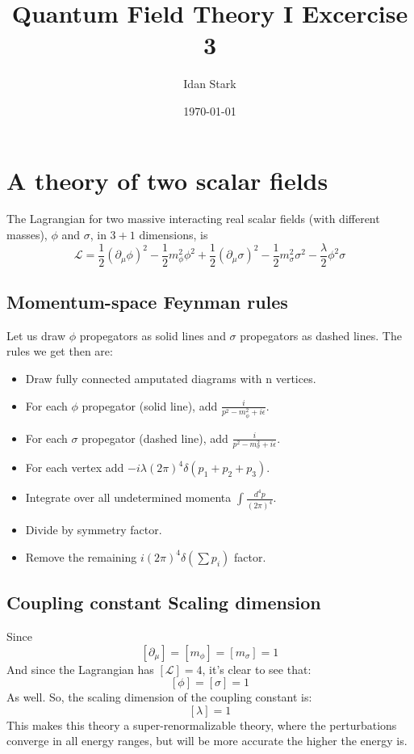 \documentclass{article}
\title{Quantum Field Theory I Excercise 3}
\author{Idan Stark}
\date{\today}
\begin{document}
\maketitle

\section{A theory of two scalar fields}
The Lagrangian for two massive interacting real scalar fields (with different masses), $\phi$ and $\sigma$, in $3 + 1$ dimensions, is
\begin{equation}
    \mathcal{L} = \frac{1}{2}(\partial_\mu \phi)^2 - \frac{1}{2}m_\phi^2 \phi^2 + \frac{1}{2}(\partial_\mu \sigma)^2 - \frac{1}{2}m_\sigma^2 \sigma^2 - \frac{\lambda}{2} \phi^2 \sigma
\end{equation}
\subsection{Momentum-space Feynman rules}
Let us draw $\phi$ propegators as solid lines and $\sigma$ propegators as  dashed lines. The rules we get then are:
\begin{itemize}
    \item Draw fully connected amputated diagrams with n vertices.
    \item For each $\phi$ propegator (solid line), add $\frac{i}{p^2 - m_\phi^2 + i\epsilon}$.
    \item For each $\sigma$ propegator (dashed line), add $\frac{i}{p^2 - m_\sigma^2 + i\epsilon}$.
    \item For each vertex add $-i\lambda (2\pi)^4 \delta(p_1 + p_2 + p_3)$.
    \item Integrate over all undetermined momenta $\int \frac{d^4p}{(2\pi)^4}$.
    \item Divide by symmetry factor.
    \item Remove the remaining $i(2\pi)^4\delta(\sum p_i)$ factor.
\end{itemize}
\subsection{Coupling constant Scaling dimension}
Since
\begin{equation}
    \left[\partial_\mu\right] = \left[m_\phi\right] = \left[m_\sigma\right] = 1
\end{equation}
And since the Lagrangian has $\left[\mathcal{L}\right] = 4$, it's clear to see that:
\begin{equation}
    \left[\phi\right] = \left[\sigma\right] = 1
\end{equation}
As well. So, the scaling dimension of the coupling constant is:
\begin{equation}
    \left[\lambda\right] = 1
\end{equation}
This makes this theory a super-renormalizable theory, where the perturbations converge in all energy ranges, but will be more accurate the higher the energy is.
\end{document}
